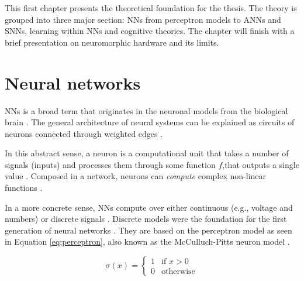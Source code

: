 \documentclass[report.tex]{subfiles}
\begin{document}
This first chapter presents the theoretical foundation for the thesis.
The theory is grouped into three major section: 
\glspl{NN} from perceptron models to \glspl{ANN} and \glspl{SNN}, 
learning within \glspl{NN} and cognitive theories.
The chapter will finish with a brief presentation on
neuromorphic hardware and its limits.

\section{Neural networks} \label{sec:nn}
\Glspl{NN} is a broad term that originates in the neuronal models from
the biological brain \cite{Dayan2001}.
The general architecture of neural systems can be explained as circuits
of neurons  connected through weighted edges
\cite{Russel2007, Dayan2001}.

In this abstract sense, a neuron is a computational unit that
takes a number of signals (inputs) and processes them through some
function $f$,that outputs a single value \cite{Eliasmith2004}.
Composed in a network, neurons can \textit{compute} 
complex non-linear functions \cite{Eliasmith2004, Dayan2001}.

In a more concrete sense, \gls{NN}s compute over either
continuous (e.g., voltage and numbers) or discrete signals
\cite{Russel2007, Schmidhuber2014}.
Discrete models were the foundation for
the first generation of neural networks \cite{Russel2007, Maass1997}.
They are based on the perceptron model as seen in Equation
\ref{eq:perceptron}, also known as the McCulluch-Pitts neuron model
\cite{Eliasmith2004}.

\begin{equation} \label{eq:perceptron}
\sigma(x) = \begin{cases}
	 1 & \text{if } x > 0\\
	 0 & \text{otherwise}
       \end{cases}
\end{equation}
\end{document}
